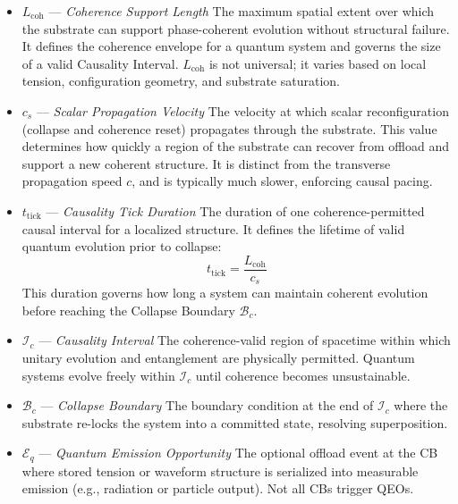 \documentclass[preprints,article,submit,pdftex,moreauthors]{Definitions/mdpi}
\begin{document}
\begin{itemize}
  \item \textbf{\( L_{\text{coh}} \)} — \textit{Coherence Support Length}  
  The maximum spatial extent over which the substrate can support phase-coherent evolution without structural failure. It defines the coherence envelope for a quantum system and governs the size of a valid Causality Interval. \( L_{\text{coh}} \) is not universal; it varies based on local tension, configuration geometry, and substrate saturation.

  \item \textbf{\( c_s \)} — \textit{Scalar Propagation Velocity}  
  The velocity at which scalar reconfiguration (collapse and coherence reset) propagates through the substrate. This value determines how quickly a region of the substrate can recover from offload and support a new coherent structure. It is distinct from the transverse propagation speed \( c \), and is typically much slower, enforcing causal pacing.

  \item \textbf{\( t_{\text{tick}} \)} — \textit{Causality Tick Duration}  
  The duration of one coherence-permitted causal interval for a localized structure. It defines the lifetime of valid quantum evolution prior to collapse:
  \[
  t_{\text{tick}} = \frac{L_{\text{coh}}}{c_s}
  \]
  This duration governs how long a system can maintain coherent evolution before reaching the Collapse Boundary \( \mathcal{B}_c \).

  \item \textbf{\( \mathcal{I}_c \)} — \textit{Causality Interval}  
  The coherence-valid region of spacetime within which unitary evolution and entanglement are physically permitted. Quantum systems evolve freely within \( \mathcal{I}_c \) until coherence becomes unsustainable.

  \item \textbf{\( \mathcal{B}_c \)} — \textit{Collapse Boundary}  
  The boundary condition at the end of \( \mathcal{I}_c \) where the substrate re-locks the system into a committed state, resolving superposition.

  \item \textbf{\( \mathcal{E}_q \)} — \textit{Quantum Emission Opportunity}  
  The optional offload event at the CB where stored tension or waveform structure is serialized into measurable emission (e.g., radiation or particle output). Not all CBs trigger QEOs.

\end{itemize}
\end{document}

